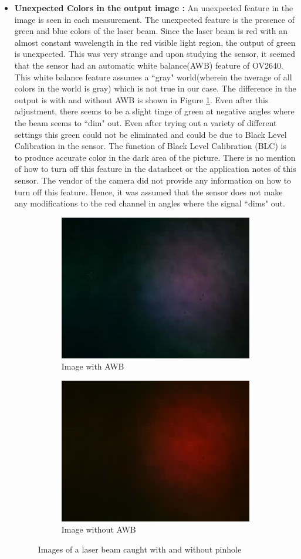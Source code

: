 \begin{itemize}
\item \textbf{Unexpected Colors in the output image :} An unexpected feature in the image is seen in each measurement. The unexpected feature is the presence of green and blue colors of the laser beam. Since the laser beam is red with an almost constant wavelength in the red visible light region, the output of green is unexpected. This was very strange and upon studying the sensor, it seemed that the sensor had an automatic white balance(AWB) feature of OV2640. This white balance feature assumes a ``gray" world(wherein the average of all colors in the world is gray)\cite{OV2640SoftwareApp} which is not true in our case. The difference in the output is with and without AWB is shown in Figure \ref{fig:AWB}. Even after this adjustment, there seems to be a slight tinge of green at negative angles where the beam seems to ``dim" out. Even after trying out a variety of different settings this green could not be eliminated and could be due to Black Level Calibration in the sensor. The function of Black Level Calibration (BLC) is to produce accurate color in the dark area of the picture. There is no mention of how to turn off this feature in the datasheet or the application notes of this sensor. The vendor of the camera did not provide any information on how to turn off this feature. Hence, it was assumed that the sensor does not make any modifications to the red channel in angles where the signal ``dims" out.
\begin{figure}[ht]
    \begin{subfigure}{0.5\textwidth}
    \centering
        \includegraphics[width=0.5\linewidth]{pics/awb.jpg}
        \caption{Image with AWB}
    \end{subfigure}%
    \begin{subfigure}{0.5\textwidth}
    \centering
        \includegraphics[width=0.5\linewidth]{pics/withoutawb.jpg}
        \caption{Image without AWB}
    \end{subfigure}
    \caption{Images of a laser beam caught with and without pinhole}
    \label{fig:AWB}
    \end{figure}
\end{itemize}
